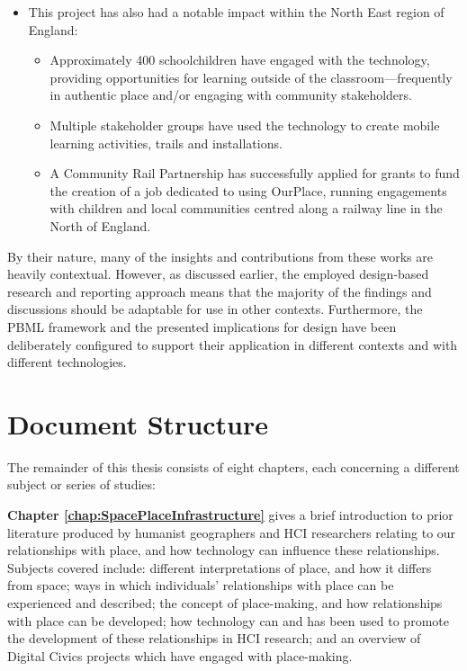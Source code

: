 \begin{itemize}
    \item This project has also had a notable impact within the North East region of England:
    \begin{itemize}
    \item Approximately 400 schoolchildren have engaged with the technology, providing opportunities for learning outside of the classroom---frequently in authentic place and/or engaging with community stakeholders.
    \item Multiple stakeholder groups have used the technology to create mobile learning activities, trails and installations.
    \item A Community Rail Partnership has successfully applied for grants to fund the creation of a job dedicated to using OurPlace, running engagements with children and local communities centred along a railway line in the North of England.
    \end{itemize}
\end{itemize}

By their nature, many of the insights and contributions from these works are heavily contextual. However, as discussed earlier, the employed design-based research and reporting approach means that the majority of the findings and discussions should be adaptable for use in other contexts. Furthermore, the PBML framework and the presented implications for design have been deliberately configured to support their application in different contexts and with different technologies.

\section{Document Structure}

The remainder of this thesis consists of eight chapters, each concerning a different subject or series of studies: 

\textbf{Chapter \ref{chap:SpacePlaceInfrastructure}} gives a brief introduction to prior literature produced by humanist geographers and HCI researchers relating to our relationships with place, and how technology can influence these relationships. Subjects covered include: different interpretations of place, and how it differs from space; ways in which individuals' relationships with place can be experienced and described; the concept of place-making, and how relationships with place can be developed; how technology can and has been used to promote the development of these relationships in HCI research; and an overview of Digital Civics projects which have engaged with place-making.

